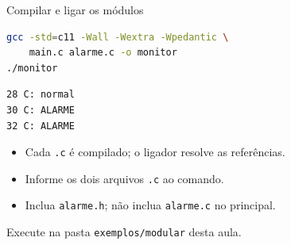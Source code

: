 \begin{frame}[fragile]{Compilar e ligar os módulos}
\begin{lstlisting}[language=bash]
gcc -std=c11 -Wall -Wextra -Wpedantic \
    main.c alarme.c -o monitor
./monitor
\end{lstlisting}
\begin{lstlisting}[language={}]
28 C: normal
30 C: ALARME
32 C: ALARME
\end{lstlisting}
\begin{itemize}
\item Cada \texttt{.c} é compilado; o ligador resolve as referências.
\item Informe os dois arquivos \texttt{.c} ao comando.
\item Inclua \texttt{alarme.h}; não inclua \texttt{alarme.c} no principal.
\end{itemize}
\small Execute na pasta \texttt{exemplos/modular} desta aula.
\end{frame}
